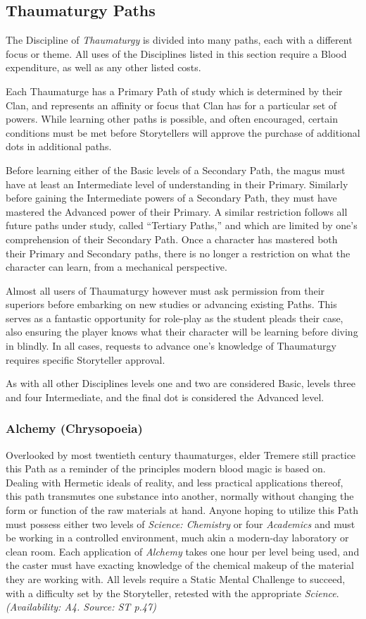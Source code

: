 \subsection{Thaumaturgy Paths}
\label{sec:tpaths}
The Discipline of \emph{Thaumaturgy} is divided into many paths, each with a different 
focus or theme.  All uses of the Disciplines listed in this section require a Blood 
expenditure, as well as any other listed costs.

Each Thaumaturge has a Primary Path of study which is determined by their Clan, and represents an 
affinity or focus that Clan has for a particular set of powers.  While learning other paths is 
possible, and often encouraged, certain conditions must be met before Storytellers will approve 
the purchase of additional dots in additional paths.

Before learning either of the Basic levels of a Secondary Path, the magus must have at least an 
Intermediate level of understanding in their Primary.  Similarly before gaining the Intermediate 
powers of a Secondary Path, they must have mastered the Advanced power of their Primary.  A 
similar restriction follows all future paths under study, called ``Tertiary Paths,'' and which 
are limited by one's comprehension of their Secondary Path.  Once a character has mastered both 
their Primary and Secondary paths, there is no longer a restriction on what the character can 
learn, from a mechanical perspective.

Almost all users of Thaumaturgy however must ask permission from their superiors before embarking 
on new studies or advancing existing Paths.  This serves as a fantastic opportunity for role-play 
as the student pleads their case, also ensuring the player knows what their character will be 
learning before diving in blindly.  In all cases, requests to advance one's knowledge of 
Thaumaturgy requires specific Storyteller approval.

As with all other Disciplines levels one and two are considered Basic, levels three and four 
Intermediate, and the final dot is considered the Advanced level.

\subsubsection{Alchemy (Chrysopoeia)}
Overlooked by most twentieth century thaumaturges, elder Tremere still practice this Path as a 
reminder of the principles modern blood magic is based on.  Dealing with Hermetic ideals of reality, 
and less practical applications thereof, this path transmutes one substance into another, normally 
without changing the form or function of the raw materials at hand.  Anyone hoping to utilize this 
Path must possess either two levels of \emph{Science: Chemistry} or four \emph{Academics} and must 
be working in a controlled environment, much akin a modern-day laboratory or clean room.   Each 
application of \emph{Alchemy} takes one hour per level being used, and the caster must have exacting 
knowledge of the chemical makeup of the material they are working with.  All levels require a 
Static Mental Challenge to succeed, with a difficulty set by the Storyteller, retested with 
the appropriate \emph{Science}.  \emph{(Availability: A4.  Source: ST p.47)}


